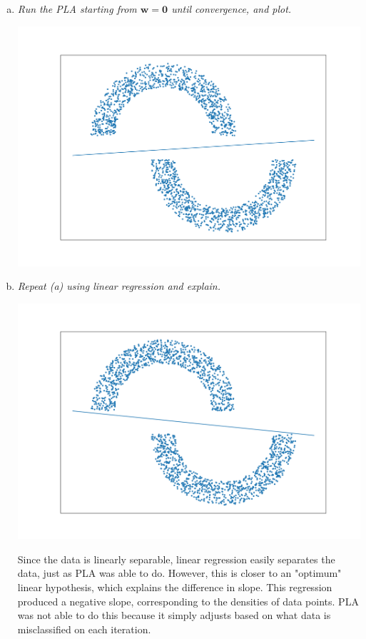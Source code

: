 \documentclass{article}
\renewcommand{\vec}[1]{\mathbf{#1}}
\begin{document}
\begin{enumerate}[(a)]
  \item \textit{Run the PLA starting from $\vec{w} = \vec{0}$ until convergence, and plot.}

    \begin{center}
      \includegraphics[width=\textwidth]{31a.png}
    \end{center}

  \item \textit{Repeat (a) using linear regression and explain.}

    \begin{center}
      \includegraphics[width=\textwidth]{31b.png}
    \end{center}

    Since the data is linearly separable, linear regression easily separates the data, just as
    PLA was able to do. However, this is closer to an "optimum" linear hypothesis, which explains
    the difference in slope. This regression produced a negative slope, corresponding to the
    densities of data points. PLA was not able to do this because it simply adjusts based on what
    data is misclassified on each iteration.

\end{enumerate}
\end{document}
